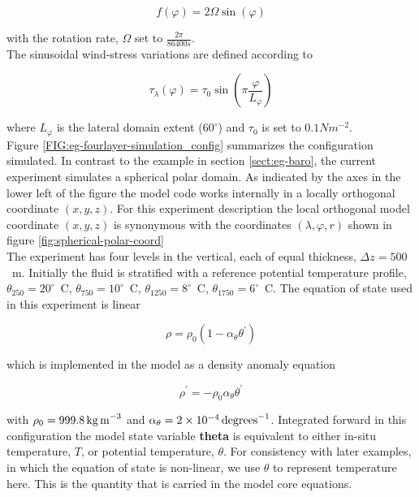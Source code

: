\begin{equation}
\label{EQ:eg-fourlayer-fcori}
f(\varphi) = 2 \Omega \sin( \varphi )
\end{equation}
 
\noindent with the rotation rate, $\Omega$ set to $\frac{2 \pi}{86400s}$.
\\
  
 The sinusoidal wind-stress variations are defined according to 

\begin{equation}
\label{EQ:taux}
\tau_{\lambda}(\varphi) = \tau_{0}\sin(\pi \frac{\varphi}{L_{\varphi}})
\end{equation}
 
\noindent where $L_{\varphi}$ is the lateral domain extent ($60^{\circ}$) and 
$\tau_0$ is set to $0.1N m^{-2}$. 
\\

Figure \ref{FIG:eg-fourlayer-simulation_config}
summarizes the configuration simulated.
In contrast to the example in section \ref{sect:eg-baro}, the 
current experiment simulates a spherical polar domain. As indicated
by the axes in the lower left of the figure the model code works internally
in a locally orthogonal coordinate $(x,y,z)$. For this experiment description 
the local orthogonal model coordinate $(x,y,z)$ is synonymous 
with the coordinates $(\lambda,\varphi,r)$ shown in figure
\ref{fig:spherical-polar-coord}
\\

The experiment has four levels in the vertical, each of equal thickness,
$\Delta z = 500$~m. Initially the fluid is stratified with a reference
potential temperature profile,
$\theta_{250}=20^{\circ}$~C,
$\theta_{750}=10^{\circ}$~C,
$\theta_{1250}=8^{\circ}$~C,
$\theta_{1750}=6^{\circ}$~C. The equation of state used in this experiment is 
linear

\begin{equation}
\label{EQ:eg-fourlayer-linear1_eos}
\rho = \rho_{0} ( 1 - \alpha_{\theta}\theta^{'} )
\end{equation}

\noindent which is implemented in the model as a density anomaly equation

\begin{equation}
\label{EQ:eg-fourlayer-linear1_eos_pert}
\rho^{'} = -\rho_{0}\alpha_{\theta}\theta^{'}
\end{equation}

\noindent with $\rho_{0}=999.8\,{\rm kg\,m}^{-3}$ and 
$\alpha_{\theta}=2\times10^{-4}\,{\rm degrees}^{-1} $. Integrated forward in
this configuration the model state variable {\bf theta} is equivalent to
either in-situ temperature, $T$, or potential temperature, $\theta$. For 
consistency with later examples, in which the equation of state is
non-linear, we use $\theta$ to represent temperature here. This is
the quantity that is carried in the model core equations.

